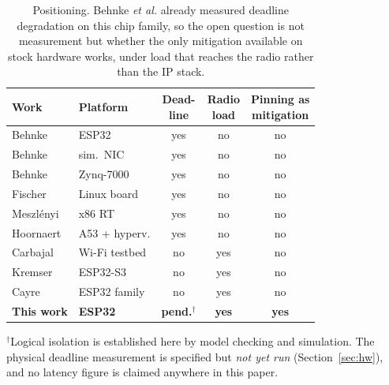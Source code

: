 \begin{table}[t]
\centering\footnotesize
\caption{Positioning. Behnke \emph{et al.} already measured deadline degradation on this chip
family, so the open question is not measurement but whether the only mitigation available on
stock hardware works, under load that reaches the radio rather than the IP stack.}
\label{tab:position}
\setlength{\tabcolsep}{4pt}
\begin{tabular}{@{}llccc@{}}
\toprule
Work & Platform & \shortstack{Dead-\\line} & \shortstack{Radio\\load}
     & \shortstack{Pinning as\\mitigation} \\
\midrule
Behnke~\cite{behnke2020}        & ESP32          & yes & no  & no  \\
Behnke~\cite{behnke2022}        & sim.\ NIC      & yes & no  & no  \\
Behnke~\cite{behnke2023}        & Zynq-7000      & yes & no  & no  \\
Fischer~\cite{fischer2020}      & Linux board    & yes & no  & no  \\
Meszl\'enyi~\cite{timingiso2025}& x86 RT         & yes & no  & no  \\
Hoornaert~\cite{mcti2024}       & A53 + hyperv.  & yes & no  & no  \\
Carbajal~\cite{carbajal2026}    & Wi-Fi testbed  & no  & yes & no  \\
Kremser~\cite{deauther2026}     & ESP32-S3       & no  & yes & no  \\
Cayre~\cite{espwn2023}          & ESP32 family   & no  & yes & no  \\
\midrule
\textbf{This work}              & \textbf{ESP32} & \textbf{pend.}$^\dagger$
                                & \textbf{yes}   & \textbf{yes} \\
\bottomrule
\end{tabular}

\vspace{0.3em}
{\footnotesize $^\dagger$Logical isolation is established here by model checking and simulation.
The physical deadline measurement is specified but \emph{not yet run} (Section~\ref{sec:hw}),
and no latency figure is claimed anywhere in this paper.}
\end{table}

